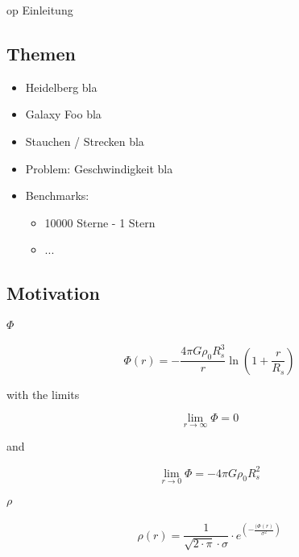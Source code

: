 op
Einleitung

\subsection{Themen}

\begin{itemize}
  \item Heidelberg bla
  \item Galaxy Foo bla
  \item Stauchen / Strecken bla
  \item Problem: Geschwindigkeit bla
  \item Benchmarks:
  \begin{itemize}
    \item 10000 Sterne - 1 Stern
    \item ...
  \end{itemize}
\end{itemize}

\subsection{Motivation}

\paragraph{ \( \Phi \) }

\begin{equation}
  \Phi(r) = - \frac{4\pi G \rho_0 R_s^3}{r} \ln ( 1+ \frac{r}{R_s} )
\end{equation}

with the limits

\begin{equation}
  \lim_{r\to \infty} \Phi=0
\end{equation}

and

\begin{equation}
  \lim_{r\to 0} \Phi=-4\pi G\rho_0 R_s^2
\end{equation}

\paragraph{ \( \rho \) }

\begin{equation}
  \rho(r) = \frac{1}{\sqrt{2 \cdot \pi} \cdot \sigma} \cdot
  e^{\left( - \frac{(\Phi(r)}{\sigma^{2}} \right)}
\end{equation}

